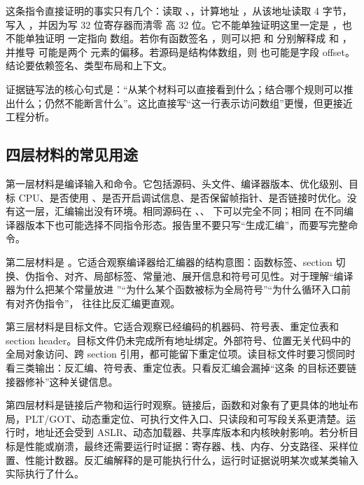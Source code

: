 这条指令直接证明的事实只有几个：读取 、，计算地址 ，从该地址读取 4 字节，写入 ，并因为写 32 位寄存器而清零  高 32 位。它不能单独证明这里一定是 ，也不能单独证明  一定指向  数组。若你有函数签名 ，则可以把  和  分别解释成  和 ，并推导  可能是两个  元素的偏移。若源码是结构体数组，则  也可能是字段 offset。结论要依赖签名、类型布局和上下文。

\begin{mentalmodel}
证据链写法的核心句式是：“从某个材料可以直接看到什么；结合哪个规则可以推出什么；仍然不能断言什么”。这比直接写“这一行表示访问数组”更慢，但更接近工程分析。
\end{mentalmodel}

\subsection{四层材料的常见用途}

第一层材料是编译输入和命令。它包括源码、头文件、编译器版本、优化级别、目标 CPU、是否使用 、是否开启调试信息、是否保留帧指针、是否链接时优化。没有这一层，汇编输出没有环境。相同源码在 、、 下可以完全不同；相同  在不同编译器版本下也可能选择不同指令形态。报告里不要只写“生成汇编”，而要写完整命令。

第二层材料是 。它适合观察编译器给汇编器的结构意图：函数标签、section 切换、伪指令、对齐、局部标签、常量池、展开信息和符号可见性。对于理解“编译器为什么把某个常量放进 ”“为什么某个函数被标为全局符号”“为什么循环入口前有对齐伪指令”， 往往比反汇编更直观。

第三层材料是目标文件。它适合观察已经编码的机器码、符号表、重定位表和 section header。目标文件仍未完成所有地址绑定。外部符号、位置无关代码中的全局对象访问、跨 section 引用，都可能留下重定位项。读目标文件时要习惯同时看三类输出：反汇编、符号表、重定位表。只看反汇编会漏掉“这条  的目标还要链接器修补”这种关键信息。

第四层材料是链接后产物和运行时观察。链接后，函数和对象有了更具体的地址布局，PLT/GOT、动态重定位、可执行文件入口、只读段和可写段关系更清楚。运行时，地址还会受到 ASLR、动态加载器、共享库版本和内核映射影响。若分析目标是性能或崩溃，最终还需要运行时证据：寄存器、栈、内存、分支路径、采样位置、性能计数器。反汇编解释的是可能执行什么，运行时证据说明某次或某类输入实际执行了什么。

